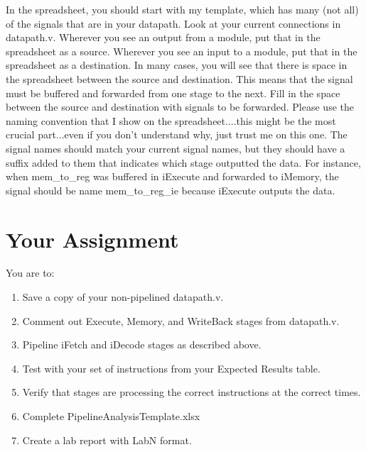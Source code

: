 In the spreadsheet, you should start with my template, which has many (not all) of the signals that are in your datapath.  Look at your current connections in datapath.v.  Wherever you see an output from a module, put that in the spreadsheet as a source.  Wherever you see an input to a module, put that in the spreadsheet as a destination.  In many cases, you will see that there is space in the spreadsheet between the source and destination.  This means that the signal must be buffered and forwarded from one stage to the next.  Fill in the space between the source and destination with signals to be forwarded.  Please use the naming convention that I show on the spreadsheet....this might be the most crucial part...even if you don't understand why, just trust me on this one.  The signal names should match your current signal names, but they should have a suffix added to them that indicates which stage outputted the data.  For instance, when mem\_to\_reg was buffered in iExecute and forwarded to iMemory, the signal should be name mem\_to\_reg\_ie because iExecute outputs the data. 


\section{Your Assignment}

You are to:
\begin{enumerate}
\item Save a copy of your non-pipelined datapath.v.
\item Comment out Execute, Memory, and WriteBack stages from datapath.v.
\item Pipeline iFetch and iDecode stages as described above.   
\item Test with your set of instructions from your Expected Results table.
\item Verify that stages are processing the correct instructions at the correct times.
\item Complete PipelineAnalysisTemplate.xlsx
\item Create a lab report with LabN format.
\end{enumerate} 